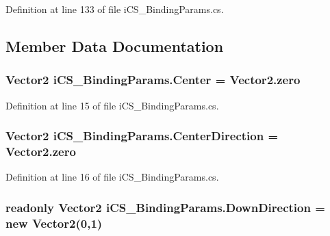 Definition at line 133 of file i\+C\+S\+\_\+\+Binding\+Params.\+cs.



\subsection{Member Data Documentation}
\hypertarget{classi_c_s___binding_params_ac16427404ded431ca3232465c22f8eb0}{
\subsubsection[{Center}]{\setlength{\rightskip}{0pt plus 5cm}Vector2 i\+C\+S\+\_\+\+Binding\+Params.\+Center = Vector2.\+zero}}\label{classi_c_s___binding_params_ac16427404ded431ca3232465c22f8eb0}


Definition at line 15 of file i\+C\+S\+\_\+\+Binding\+Params.\+cs.

\hypertarget{classi_c_s___binding_params_ac9c70ab3dec6e0542e4df8043d813451}{
\subsubsection[{Center\+Direction}]{\setlength{\rightskip}{0pt plus 5cm}Vector2 i\+C\+S\+\_\+\+Binding\+Params.\+Center\+Direction = Vector2.\+zero}}\label{classi_c_s___binding_params_ac9c70ab3dec6e0542e4df8043d813451}


Definition at line 16 of file i\+C\+S\+\_\+\+Binding\+Params.\+cs.

\hypertarget{classi_c_s___binding_params_a6c93711d002e26f0ad98c251f13094e2}{
\subsubsection[{Down\+Direction}]{\setlength{\rightskip}{0pt plus 5cm}readonly Vector2 i\+C\+S\+\_\+\+Binding\+Params.\+Down\+Direction = new Vector2(0,1)\hspace{0.3cm}{\ttfamily [static]}}}\label{classi_c_s___binding_params_a6c93711d002e26f0ad98c251f13094e2}


